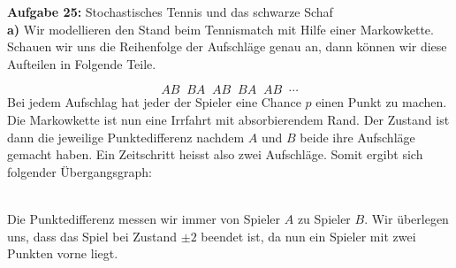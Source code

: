 \documentclass[a4paper]{article}
\begin{document}
\textbf{Aufgabe 25:} Stochastisches Tennis und das schwarze Schaf
\\

\textbf{a)} 
Wir modellieren den Stand beim Tennismatch mit Hilfe einer Markowkette.
Schauen wir uns die Reihenfolge der Aufschläge genau an, dann können wir diese
Aufteilen in Folgende Teile.

\[
AB\;\; BA\;\; AB\;\; BA\;\; AB\;\; \cdots
\] 
Bei jedem Aufschlag hat jeder der Spieler eine Chance $p$ einen Punkt zu machen.
Die Markowkette ist nun eine Irrfahrt mit absorbierendem Rand.
Der Zustand ist dann die jeweilige Punktedifferenz nachdem $A$ und $B$ beide ihre Aufschläge
gemacht haben.
Ein Zeitschritt heisst also zwei Aufschläge.
Somit ergibt sich folgender Übergangsgraph:

\begin{center}
\end{center}
\\

Die Punktedifferenz messen wir immer von Spieler $A$ zu Spieler $B$.
Wir überlegen uns, dass das Spiel bei Zustand $\pm2$ beendet ist, da nun ein Spieler mit
zwei Punkten vorne liegt.
\end{document}

